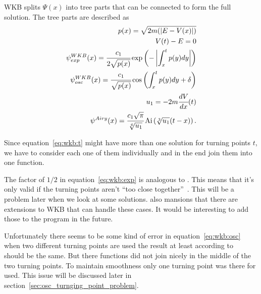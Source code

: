 \documentclass[11pt,DIV=10,final]{scrreprt} %
\begin{document}
WKB splits $\Psi(x)$ into tree parts that can be connected to form the full solution. The tree parts are described as
\begin{align}
\label{eq:wkb:momentum}
  p(x) = \sqrt{2m(|E - V(x)|)} \\
\label{eq:wkb:t}
  V(t) - E = 0 \\
\label{eq:wkb:exp}
  \psi^{WKB}_{exp}(x)= \cfrac{c_{1}}{2 \sqrt{p(x)}} \exp\left(-\left|\int_{x}^{t}p(y) dy\right|\right) \\
\label{eq:wkb:osc}
  \psi^{WKB}_{osc} (x)= \cfrac{c_{1}}{\sqrt{p(x)}} \cos\left(\int_{x}^{t}p(y) dy + \delta \right) \\
  u_{1} = -2 m \cfrac{dV}{dx}(t) \\
\label{eq:airy}
  \psi^{Airy}(x) = \cfrac{c_{1} \sqrt{\pi}}{\sqrt[6]{u_{1}}} \operatorname{Ai}\left(\sqrt[3]{u_{1}} (t - x)\right).
\end{align}

Since equation~\ref{eq:wkb:t} might have more than one solution for turning points $t$, we have to consider each one of them individually and in the end join them into one function.

The factor of $1/2$ in equation~\ref{eq:wkb:exp} is analogous to \citep[eq. 92]{robert2020wkb}. This means that it's only valid if the turning points aren't ``too close together''~\citep{robert2020wkb}.
This will be a problem later when we look at some solutions. \cite{robert2020wkb} also mansions that there are extensions to WKB that can handle these cases. It would be interesting to add those to the
program in the future.

Unfortunately there seems to be some kind of error in equation~\ref{eq:wkb:osc} when two different turning points are used the result at least according to~\cite{hall2013quantum} should be the same.
But there functions did not join nicely in the middle of the two turning points. To maintain smoothness only one turning point was there for used. This issue will be discussed later in
section~\ref{sec:osc_turnging_point_problem}.
\end{document}
